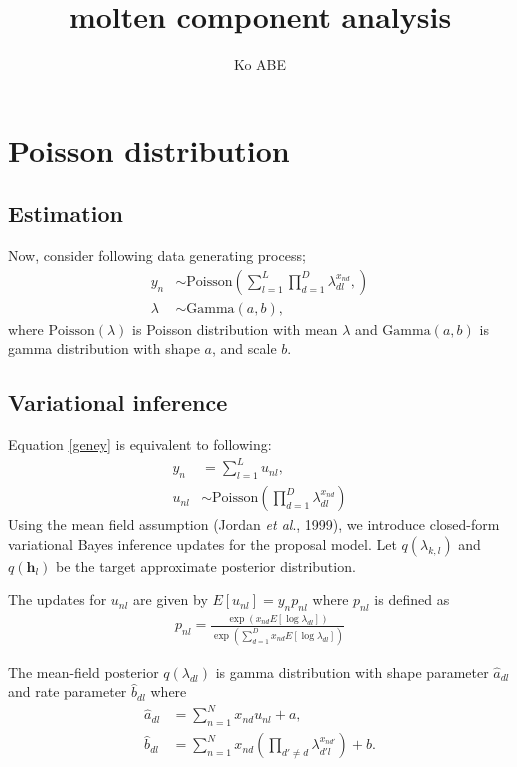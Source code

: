 \documentclass[12pt]{amsart}
\title{molten component analysis}
\author{Ko ABE}
\newcommand\Poissond{\mathrm{Poisson}}
\newcommand\Gammad{\mathrm{Gamma}}
\begin{document}
\maketitle

\section{Poisson distribution}
\subsection{Estimation}

Now, consider following data generating process; 
\begin{align}
y_n &\sim  \Poissond\left(\sum_{l=1}^L \prod_{d=1}^D \lambda_{dl}^{x_{nd}}, \right) \label{geney}\\
\lambda &\sim \Gammad(a, b), \nonumber
\end{align}
where $\Poissond(\lambda)$ is Poisson distribution with mean $\lambda$ and $\Gammad(a, b)$ is gamma distribution with shape $a$, and scale $b$. 

\subsection{Variational inference}
Equation \ref{geney} is equivalent to following:
\begin{align}
y_{n} &= \sum_{l=1}^{L} u_{nl},\nonumber \\
u_{nl} &\sim \Poissond\left(\prod_{d=1}^{D} \lambda_{dl}^{x_{nd}} \right)
\end{align}
Using the mean field assumption (Jordan \textit{et al}., 1999), we introduce closed-form variational Bayes inference updates for the proposal model.
Let $q(\lambda_{k,l})$ and $q(\boldsymbol{h}_{l})$ be the target approximate posterior distribution.

The updates for $u_{nl}$ are given by $E[u_{nl}] = y_{n} p_{nl}$ where $p_{nl}$ is defined as 
\begin{align}
p_{nl} =\frac{\exp( x_{nd} E[\log \lambda_{dl}] )}{ \exp(\sum_{d=1}^{D}x_{nd} E[\log \lambda_{dl}] )}
\end{align}

The mean-field posterior $q(\lambda_{dl})$ is gamma distribution with shape parameter $\hat a_{dl}$ and rate parameter $\hat b_{dl}$ where
\begin{align}
\hat a_{dl} &= \sum_{n=1}^{N}x_{nd} u_{nl} + a, \\
\hat b_{dl} &= \sum_{n=1}^{N} x_{nd} \left( \prod_{d'\neq d} \lambda_{d'l}^{x_{nd'}} \right) + b.
\end{align}
\end{document}
